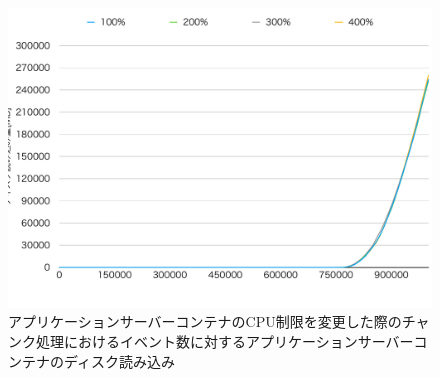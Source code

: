 \documentclass[../../../../../main]{subfiles}
\begin{document}
    \begin{figure}[H]
        \centering
        \includegraphics[width=12cm]{graph}
        \caption{アプリケーションサーバーコンテナのCPU制限を変更した際のチャンク処理におけるイベント数に対するアプリケーションサーバーコンテナのディスク読み込み}
        \label{fig:stream-change-app-cpu-limit-app-disk-out-app_1024-db_1_1024}
    \end{figure}
\end{document}
